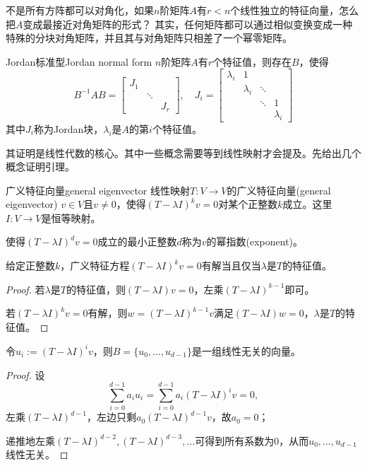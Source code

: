 
不是所有方阵都可以对角化，如果$n$阶矩阵$A$有$r<n$个线性独立的特征向量，怎么把$A$变成最接近对角矩阵的形式？
其实，任何矩阵都可以通过相似变换变成一种特殊的分块对角矩阵，并且其与对角矩阵只相差了一个幂零矩阵。

\begin{theorem}{Jordan标准型}{Jordan normal form}
	$n$阶矩阵$A$有$r$个特征值，则存在$B$，使得
	\[
		B^{-1}AB=\begin{bmatrix}
			J_1             \\
			 & \ddots       \\
			 &        & J_r
		\end{bmatrix},\quad
		J_i=\begin{bmatrix}
			\lambda_i & 1                              \\
			          & \lambda_i & \ddots             \\
			          &           & \ddots & 1         \\
			          &           &        & \lambda_i
		\end{bmatrix}
	\]
	其中$J_i$称为Jordan块，$\lambda_i$是$A$的第$i$个特征值。
\end{theorem}
其证明是线性代数的核心。其中一些概念需要等到线性映射才会提及。先给出几个概念证明引理。
\begin{definition}{广义特征向量}{general eigenvector}
	线性映射$T:V\to V$的广义特征向量(general eigenvector) $v\in V$且$v\neq 0$，使得$(T-\lambda I)^kv=0$对某个正整数$k$成立。这里$I:V\to V$是恒等映射。

	使得$(T-\lambda I)^dv=0$成立的最小正整数$d$称为$v$的幂指数(exponent)。
\end{definition}
\begin{theorem}{}{}
	给定正整数$k$，广义特征方程$(T-\lambda I)^kv=0$有解当且仅当$\lambda$是$T$的特征值。
\end{theorem}
\begin{proof}
	若$\lambda$是$T$的特征值，则$(T-\lambda I)v=0$，左乘$(T-\lambda I)^{k-1}$即可。
	
	若$(T-\lambda I)^kv=0$有解，则$w=(T-\lambda I)^{k-1}v$满足$(T-\lambda I)w=0$，$\lambda$是$T$的特征值。
\end{proof}
\begin{theorem}{}{}
	令$u_i:=(T-\lambda I)^iv$，则$B=\{u_0,\ldots,u_{d-1}\}$是一组线性无关的向量。
\end{theorem}
\begin{proof}
	设
	\[
		\sum_{i=0}^{d-1}a_iu_i=\sum_{i=0}^{d-1}a_i(T-\lambda I)^iv=0,
	\]
	左乘$(T-\lambda I)^{d-1}$，左边只剩$a_0(T-\lambda I)^{d-1}v$，故$a_0=0$；
	
	递推地左乘$(T-\lambda I)^{d-2},(T-\lambda I)^{d-3},\ldots$可得到所有系数为0，从而$u_0,\ldots,u_{d-1}$线性无关。
\end{proof}
